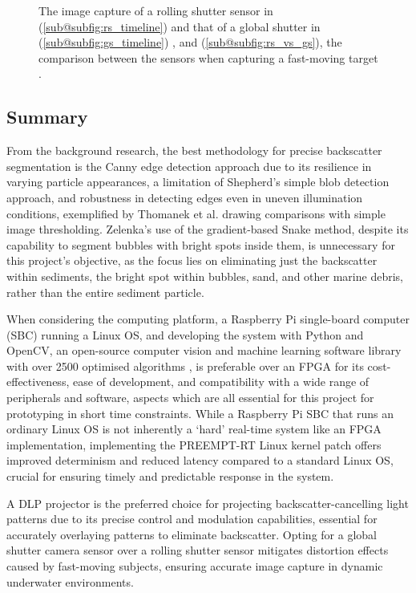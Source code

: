 \begin{figure}[H]
\begin{subfigure}{0.45\textwidth}
        \caption{}
        \label{subfig:rs_vs_gs}
    \end{subfigure}
    \caption{The image capture of a rolling shutter sensor in (\ref{sub@subfig:rs_timeline}) and that of a global shutter in (\ref{sub@subfig:gs_timeline}) \cite{reddigitalcinemaGlobalRollingShutters}, and (\ref{sub@subfig:rs_vs_gs}), the comparison between the sensors when capturing a fast-moving target \cite{RollingShutterVs}.}
    \label{fig:rs_vs_gs}
\end{figure}

\subsection{Summary}
\label{bisummary}

From the background research, the best methodology for precise backscatter segmentation is the Canny edge detection approach due to its resilience in varying particle appearances, a limitation of Shepherd's simple blob detection approach, and robustness in detecting edges even in uneven illumination conditions, exemplified by Thomanek et al. drawing comparisons with simple image thresholding. Zelenka's use of the gradient-based Snake method, despite its capability to segment bubbles with bright spots inside them, is unnecessary for this project's objective, as the focus lies on eliminating just the backscatter within sediments, the bright spot within bubbles, sand, and other marine debris, rather than the entire sediment particle.

When considering the computing platform, a Raspberry Pi single-board computer (SBC) running a Linux OS, and developing the system with Python and OpenCV, an open-source computer vision and machine learning software library with over 2500 optimised algorithms \cite{opencv}, is preferable over an FPGA for its cost-effectiveness, ease of development, and compatibility with a wide range of peripherals and software, aspects which are all essential for this project for prototyping in short time constraints. While a Raspberry Pi SBC that runs an ordinary Linux OS is not inherently a `hard' real-time system like an FPGA implementation, implementing the PREEMPT-RT Linux kernel patch offers improved determinism and reduced latency compared to a standard Linux OS, crucial for ensuring timely and predictable response in the system.

A DLP projector is the preferred choice for projecting backscatter-cancelling light patterns due to its precise control and modulation capabilities, essential for accurately overlaying patterns to eliminate backscatter. Opting for a global shutter camera sensor over a rolling shutter sensor mitigates distortion effects caused by fast-moving subjects, ensuring accurate image capture in dynamic underwater environments.
